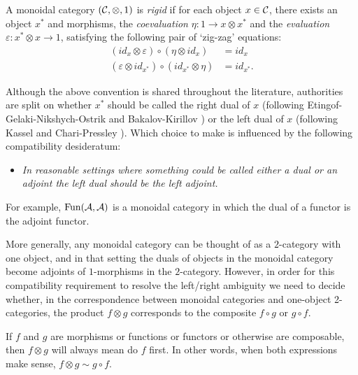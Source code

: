 \documentclass{amsart}
\begin{document}
\begin{definition} \label{def:rigid}
	A monoidal category $(\mathcal C, \otimes, 1)$ is {\em rigid} if for each object $x \in \mathcal C$, there exists an object $x^*$ and morphisms, the {\em coevaluation} $\eta: 1 \to x \otimes x^*$ and the {\em evaluation} $\varepsilon: x^* \otimes x \to 1$, satisfying the following pair of `zig-zag' equations:
	\begin{align*}
		(id_{x} \otimes \varepsilon  ) \circ (  \eta \otimes id_{x}) &= id_{x} \\
		(\varepsilon \otimes id_{x^*}) \circ (id_{x^*} \otimes \eta) &= id_{x^*}.
	\end{align*}
\end{definition}

Although the above convention is shared throughout the literature, authorities are split on whether $x^*$ should be called the right dual of $x$ (following Etingof-Gelaki-Nikshych-Ostrik \cite{EGNO} and Bakalov-Kirillov \cite{MR1797619})  or the left dual of $x$ (following Kassel \cite{MR1470954} and Chari-Pressley \cite{MR1358358}).  Which choice to make is influenced by the following compatibility desideratum: 
\begin{itemize}
\item[]
	\emph{In reasonable settings where something could be called either a dual or an adjoint the left dual should be the left adjoint.}
\end{itemize}

\nid For example, $\operatorname{Fun}(\mathcal A, \mathcal A)$ is a monoidal category in which the dual of a functor is the adjoint functor.  

More generally, any monoidal category can be thought of as a $2$-category with one object, and in that setting the duals of objects in the monoidal category become adjoints of $1$-morphisms in the $2$-category.  However, in order for this compatibility requirement to resolve the left/right ambiguity we need to decide whether, in the correspondence between monoidal categories and one-object 2-categories, the product $f \otimes g$ corresponds to the composite $f \circ g$ or $g \circ f$.

\begin{definition}
If $f$ and $g$ are morphisms or functions or functors or otherwise are composable, then $f \otimes g$ will always mean do $f$ first. In other words, when both expressions make sense, $f \otimes g \sim g \circ f$.
\end{definition}
\end{document}
